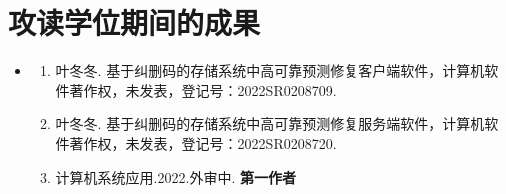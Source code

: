 \chapter{攻读学位期间的成果}

\begin{itemize}
	\setlength{\itemsep}{5pt}
	
	\item \textbf{\heiti{}}
	      \begin{enumerate}
	      	\setlength{\itemsep}{-\itemsep}  %
	      	\item 叶冬冬. 基于纠删码的存储系统中高可靠预测修复客户端软件，计算机软件著作权，未发表，登记号：2022SR0208709.
	      	\item 叶冬冬. 基于纠删码的存储系统中高可靠预测修复服务端软件，计算机软件著作权，未发表，登记号：2022SR0208720.
	      	\item 计算机系统应用.2022.外审中. \textbf{第一作者}
	      \end{enumerate}
	      

\end{itemize}
